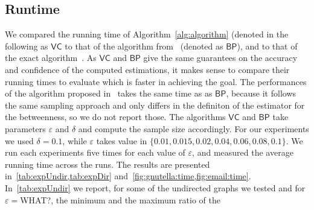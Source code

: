 \subsection{Runtime}\label{sec:runtime}
We compared the running time of Algorithm~\ref{alg:algorithm} (denoted in the
following as $\mathsf{VC}$ to that of the algorithm
from~\citep{JacobKLPT05,BrandesP07,GeisbergerSS08}
(denoted as $\mathsf{BP}$), and to that of the exact
algorithm~\citep{Brandes01}. As $\mathsf{VC}$ and $\mathsf{BP}$ give the same
guarantees on the accuracy and confidence of the computed estimations, it makes
sense to compare their running times to evaluate which is faster in achieving
the goal. The performances of the algorithm proposed in~\citep{GeisbergerSS08}
takes the same time as as $\mathsf{BP}$, because it follows the same sampling
approach and only differs in the definiton of the estimator for the betweenness,
so we do not report those.
The algorithms $\mathsf{VC}$ and $\mathsf{BP}$ take parameters $\varepsilon$ and
$\delta$ and compute the sample size accordingly. For our experiments we used
$\delta=0.1$, while $\varepsilon$ takes value in $\{0.01, 0.015, 0.02, 0.04,
0.06, 0.08, 0.1\}$. We run each experiments five times for each value of
$\varepsilon$, and measured the average running time across the runs.
The results are presented in~\cref{tab:expUndir,tab:expDir}
and~\cref{fig:gnutella:time,fig:email:time}. 
%
In~\cref{tab:expUndir} we report, for some of the undirected graphs we tested
and for $\varepsilon=$\XXX WHAT?, the minimum and the maximum ratio of the
